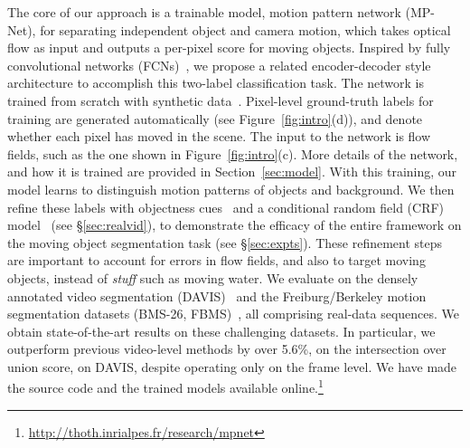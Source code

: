 \documentclass[10pt,twocolumn,letterpaper]{article}
\begin{document}
\begin{figure*}[t]
\begin{center}
\end{center}
\vspace{-0.3cm}\caption{(a,b) Two example frames from a sequence in the
FlyingThings3D dataset~\cite{Mayer16}. The camera is in motion in this scene,
along with four independently moving objects. (c) Ground-truth optical flow of
(a), which illustrates motion of both foreground objects and background with
respect to the next frame (b). (d) Ground-truth segmentation of moving objects
in this scene. \vspace{-0.5cm}}
\label{fig:intro}
\end{figure*}

The core of our approach is a trainable model, motion pattern network (MP-Net),
for separating independent object and camera motion, which takes optical flow
as input and outputs a per-pixel score for moving objects. Inspired by fully
convolutional networks (FCNs)~\cite{long2015fully,Dosovitskiy15,Ronneberger15},
we propose a related encoder-decoder style architecture to accomplish this
two-label classification task. The network is trained from scratch with
synthetic data~\cite{Mayer16}.  Pixel-level ground-truth labels for training
are generated automatically (see Figure~\ref{fig:intro}(d)), and denote whether
each pixel has moved in the scene. The input to the network is flow fields,
such as the one shown in Figure~\ref{fig:intro}(c). More details of the
network, and how it is trained are provided in Section~\ref{sec:model}. With
this training, our model learns to distinguish motion patterns of objects and
background. We then refine these labels with objectness
cues~\cite{pinheiro2016learning} and a conditional random field (CRF)
model~\cite{krahenbuhl2011efficient} (see \S\ref{sec:realvid}), to demonstrate
the efficacy of the entire framework on the moving object segmentation task
(see \S\ref{sec:expts}). These refinement steps are important to account for
errors in flow fields, and also to target moving objects, instead of
\textit{stuff} such as moving water. We evaluate on the densely annotated video
segmentation (DAVIS)~\cite{Perazzi16} and the Freiburg/Berkeley motion
segmentation datasets (BMS-26,
FBMS)~\cite{Bideau16,brox2010object,Tron07,ochs2014segmentation}, all
comprising real-data sequences. We obtain state-of-the-art results on these
challenging datasets. In particular, we outperform previous video-level methods
by over 5.6\%, on the intersection over union score, on DAVIS, despite
operating only on the frame level. We have made the source code and the trained
models available
online.\footnote{\url{http://thoth.inrialpes.fr/research/mpnet}}
\end{document}
